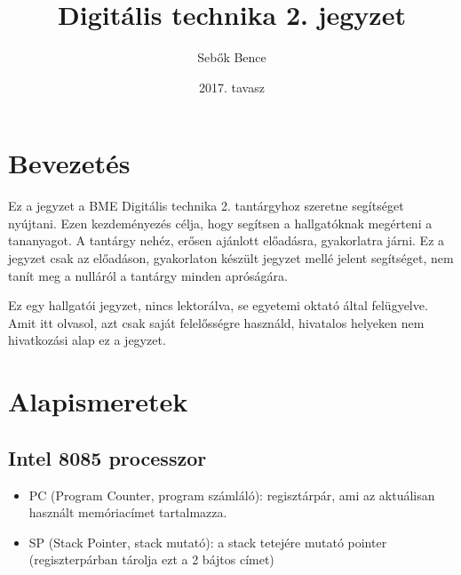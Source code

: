 \documentclass{article}
\begin{document}
\title{Digitális technika 2. jegyzet}
\author{Sebők Bence}
\date{2017. tavasz}

\maketitle

\tableofcontents

\newpage %

\section{Bevezetés}
Ez a jegyzet a BME Digitális technika 2. tantárgyhoz szeretne segítséget nyújtani. Ezen kezdeményezés célja, hogy segítsen a hallgatóknak megérteni a tananyagot. A tantárgy nehéz, erősen ajánlott előadásra, gyakorlatra járni. Ez a jegyzet csak az előadáson, gyakorlaton készült jegyzet mellé jelent segítséget, nem tanít meg a nulláról a tantárgy minden apróságára.

Ez egy hallgatói jegyzet, nincs lektorálva, se egyetemi oktató által felügyelve. Amit itt olvasol, azt csak saját felelősségre használd, hivatalos helyeken nem hivatkozási alap ez a jegyzet.

\newpage %

\section{Alapismeretek}
\subsection{Intel 8085 processzor}
\begin{itemize}
	\item PC (Program Counter, program számláló): regisztárpár, ami az aktuálisan használt memóriacímet tartalmazza.
	\item SP (Stack Pointer, stack mutató): a stack tetejére mutató pointer (regiszterpárban tárolja ezt a 2 bájtos címet)
\end{itemize}
\end{document}
